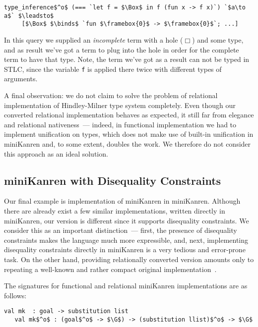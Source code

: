 \begin{lstlisting}[basicstyle=\small]
   type_inference$^o$ (=== `let f = $\Box$ in f (fun x -> f x)`) `$a\to a$` $\leadsto$ 
     [$\Box$ $\binds$ `fun $\framebox{0}$ -> $\framebox{0}$`; ...]
\end{lstlisting}

In this query we supplied an \emph{incomplete} term with a hole ($\Box$) and some type, and as result we've got a term to plug into the hole 
in order for the complete term to have that type. Note, the term we've got as a result can not be typed in STLC, since the variable \lstinline|f|
is applied there twice with different types of arguments.

A final observation: we do not claim to solve the problem of relational implementation of Hindley-Milner type system completely. Even though our converted
relational implementation behaves as expected, it still far from elegance and relational nativeness~--- indeed, in functional 
implementation we had to implement unification on types, which does not make use of built-in unification in miniKanren and, to some extent, doubles the
work. We therefore do not consider this approach as an ideal solution.

\subsection{miniKanren with Disequality Constraints}

Our final example is implementation of miniKanren in miniKanren. Although there are already exist a few similar implementations, written directly in miniKanren, 
our version is different since it supports disequality constraints. We consider this as an important distinction~--- first, the presence of disequality
constraints makes the language much more expressible, and, next, implementing disequality constraints directly in miniKanren is a very tedious
and error-prone task. On the other hand, providing relationally converted version amounts only to repeating a well-known and rather compact original 
implementation~\cite{CKanren}.

The signatures for functional and relational miniKanren implementations are as follows:

\begin{lstlisting}[basicstyle=\small]
   val mk  : goal -> substitution list
   val mk$^o$ : (goal$^o$ -> $\G$) -> (substitution llist)$^o$ -> $\G$
\end{lstlisting}

